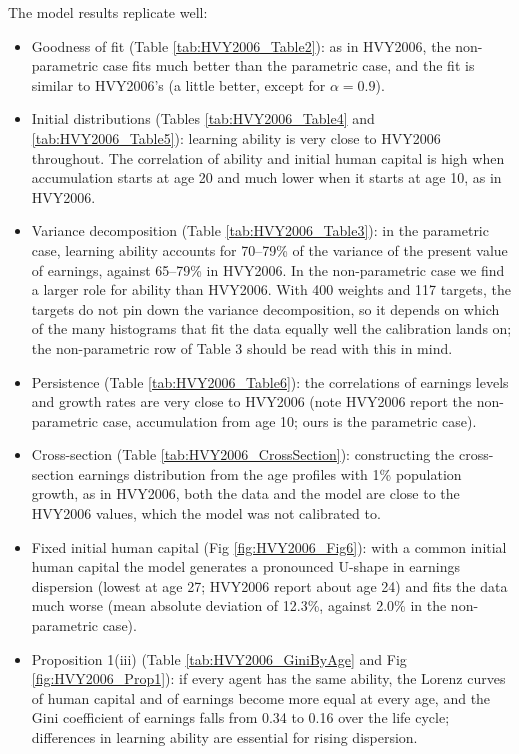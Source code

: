 \documentclass[11pt,fleqn]{article}
\begin{document}
The model results replicate well:
\begin{itemize}
 \item Goodness of fit (Table \ref{tab:HVY2006_Table2}): as in HVY2006, the non-parametric case fits much better than the parametric case, and the fit is similar to HVY2006's (a little better, except for $\alpha=0.9$).
 \item Initial distributions (Tables \ref{tab:HVY2006_Table4} and \ref{tab:HVY2006_Table5}): learning ability is very close to HVY2006 throughout. The correlation of ability and initial human capital is high when accumulation starts at age 20 and much lower when it starts at age 10, as in HVY2006.
 \item Variance decomposition (Table \ref{tab:HVY2006_Table3}): in the parametric case, learning ability accounts for 70--79\% of the variance of the present value of earnings, against 65--79\% in HVY2006. In the non-parametric case we find a larger role for ability than HVY2006. With 400 weights and 117 targets, the targets do not pin down the variance decomposition, so it depends on which of the many histograms that fit the data equally well the calibration lands on; the non-parametric row of Table 3 should be read with this in mind.
 \item Persistence (Table \ref{tab:HVY2006_Table6}): the correlations of earnings levels and growth rates are very close to HVY2006 (note HVY2006 report the non-parametric case, accumulation from age 10; ours is the parametric case).
 \item Cross-section (Table \ref{tab:HVY2006_CrossSection}): constructing the cross-section earnings distribution from the age profiles with 1\% population growth, as in HVY2006, both the data and the model are close to the HVY2006 values, which the model was not calibrated to.
 \item Fixed initial human capital (Fig \ref{fig:HVY2006_Fig6}): with a common initial human capital the model generates a pronounced U-shape in earnings dispersion (lowest at age 27; HVY2006 report about age 24) and fits the data much worse (mean absolute deviation of 12.3\%, against 2.0\% in the non-parametric case).
 \item Proposition 1(iii) (Table \ref{tab:HVY2006_GiniByAge} and Fig \ref{fig:HVY2006_Prop1}): if every agent has the same ability, the Lorenz curves of human capital and of earnings become more equal at every age, and the Gini coefficient of earnings falls from 0.34 to 0.16 over the life cycle; differences in learning ability are essential for rising dispersion.
\end{itemize}
\end{document}
